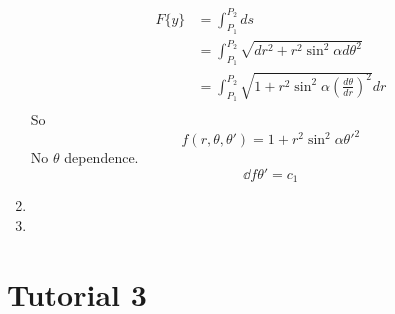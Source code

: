 \documentclass{E:/Documents/Latex/myassignment}
\begin{document}
\begin{enumerate}
	\begin{align*}
		F\{y\} &= \int_{P_1}^{P_2} ds\\
		&= \int_{P_1}^{P_2} \sqrt{dr^2 + r^2 \sin^2\alpha d\theta^2}\\
		&= \int_{P_1}^{P_2} \sqrt{1 + r^2 \sin^2\alpha \left(\frac{d\theta}{dr}\right)^{2}} dr\\
	\end{align*}
	So
	\[f(r,\theta,\theta') = 1 + r^2 \sin^2 \alpha \theta'^2\]
	No $\theta$ dependence.
	\[\dd f{\theta'} =  c_1\]
	\item 
	\item 
\end{enumerate}

\section{Tutorial 3}
\end{document}

